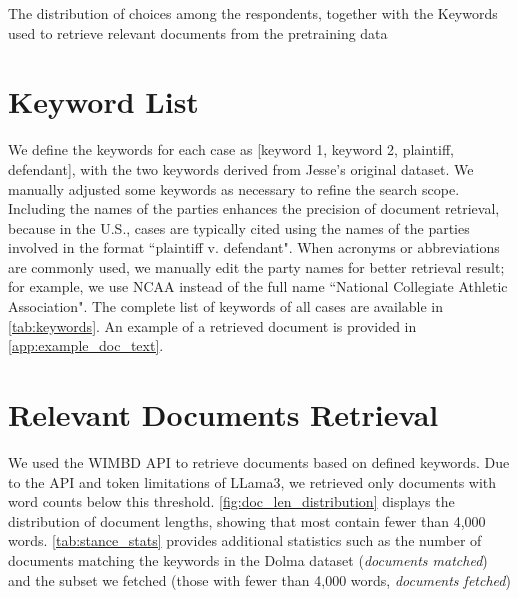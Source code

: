 
% 


\newpage
\begin{table*}[]


\caption{The distribution of choices  among the respondents, together with the Keywords used to retrieve relevant documents from the pretraining data}

\label{tab:keywords}
\end{table*}


% 





\section{Keyword List} 
\label{app:keywords}
We define the keywords for each case as [keyword 1, keyword 2, plaintiff, defendant], with the two keywords derived from Jesse's original dataset. We manually adjusted some keywords as necessary to refine the search scope. Including the names of the parties enhances the precision of document retrieval, because in the U.S., cases are typically cited using the names of the parties involved in the format ``plaintiff v. defendant". When acronyms or abbreviations are commonly used, we manually edit the party names for better retrieval result; for example, we use NCAA instead of the full name ``National Collegiate Athletic Association". The complete list of keywords of all cases are available in \autoref{tab:keywords}. An example of a retrieved document is provided in \autoref{app:example_doc_text}.

\section{Relevant Documents Retrieval} We used the WIMBD API \cite{elazar2024whats} to retrieve documents based on defined keywords. Due to the API and token limitations of LLama3, we retrieved only documents with word counts below this threshold. \autoref{fig:doc_len_distribution} displays the distribution of document lengths, showing that most contain fewer than 4,000 words. 
\autoref{tab:stance_stats} provides additional statistics such as the number of documents matching the keywords in the Dolma dataset (\textit{documents matched}) and the subset we fetched (those with fewer than 4,000 words, \textit{documents fetched})

